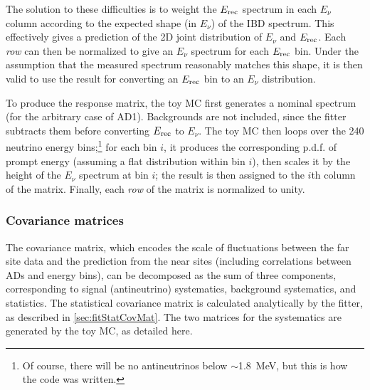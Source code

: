 \documentclass[../thesis.tex]{subfiles}
\begin{document}
The solution to these difficulties is to weight the $E_\mathrm{rec}$ spectrum in each $E_\nu$ column according to the expected shape (in $E_\nu$) of the IBD spectrum. This effectively gives a prediction of the 2D joint distribution of $E_\nu$ and $E_\mathrm{rec}$. Each \emph{row} can then be normalized to give an $E_\nu$ spectrum for each $E_\mathrm{rec}$ bin. Under the assumption that the measured spectrum reasonably matches this shape, it is then valid to use the result for converting an $E_\mathrm{rec}$ bin to an $E_\nu$ distribution.

\begin{comment}
\footnote{Given that the shape is distorted both by oscillations and by differences in the fission fractions, it is important to verify that the analysis is insensitive to such variations in the spectral shape. XXX, was this done?}
\end{comment}

\begin{comment}
  We should fix genEvisToEnuMatrix.C to turn off the theta13 oscillation, and then note below that oscillations are disabled.
\end{comment}

To produce the response matrix, the toy MC first generates a nominal spectrum (for the arbitrary case of AD1). Backgrounds are not included, since the fitter subtracts them before converting $E_\mathrm{rec}$ to $E_\nu$. The toy MC then loops over the 240 neutrino energy bins;\footnote{Of course, there will be no antineutrinos below $\sim$1.8~MeV, but this is how the code was written.} for each bin $i$, it produces the corresponding p.d.f. of prompt energy (assuming a flat distribution within bin $i$), then scales it by the height of the $E_\nu$ spectrum at bin $i$; the result is then assigned to the $i$th column of the matrix. Finally, each \emph{row} of the matrix is normalized to unity.

\subsubsection{Covariance matrices}

The covariance matrix, which encodes the scale of fluctuations between the far site data and the prediction from the near sites (including correlations between ADs and energy bins), can be decomposed as the sum of three components, corresponding to signal (antineutrino) systematics, background systematics, and statistics. The statistical covariance matrix is calculated analytically by the fitter, as described in \autoref{sec:fitStatCovMat}. The two matrices for the systematics are generated by the toy MC, as detailed here.
\end{document}
